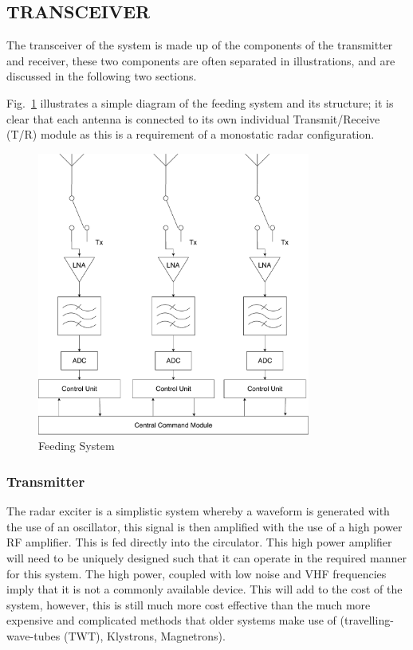 \documentclass[11pt]{witseiepaper}
\begin{document}
\begin{bibunit}[witseie]
\section{TRANSCEIVER} \label{sec:Transceiver}
The transceiver of the system is made up of the components of the transmitter and receiver, these two components are often separated in illustrations, and are discussed in the following two sections.


Fig.~\ref{fig:FeedSystem} illustrates a simple diagram of the feeding system and its structure; it is clear that each antenna is connected to its own individual Transmit/Receive (T/R) module as this is a requirement of a monostatic radar configuration.

\begin{center}
    \begin{figure}
        \centering
        \includegraphics[width=0.8\textwidth]{FeedSystem.pdf}
        \caption{Feeding System}
        \label{fig:FeedSystem}    
    \end{figure}
\end{center}

\subsubsection{Transmitter} \label{sec:Transmitter}
The radar exciter is a simplistic system whereby a waveform is generated with the use of an oscillator, this signal is then amplified with the use of a high power RF amplifier. This is fed directly into the circulator. This high power amplifier will need to be uniquely designed such that it can operate in the required manner for this system. The high power, coupled with low noise and VHF frequencies imply that it is not a commonly available device. This will add to the cost of the system, however, this is still much more cost effective than the much more expensive and complicated methods that older systems make use of (travelling-wave-tubes (TWT), Klystrons, Magnetrons)\cite[Ch.~10]{radarHandbook}.


\end{bibunit}
\end{document}
